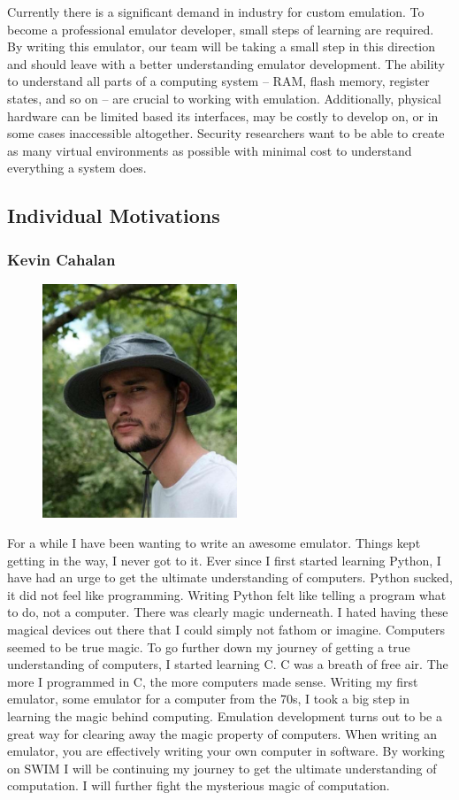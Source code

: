 \documentclass[
    paper=letter,
    parskip=half,
    fontsize=12pt,
    titlepage=firstiscover,
    toc=bibliography,
    numbers=endperiod
]{scrartcl}
\begin{document}
Currently there is a significant demand in industry for custom
emulation. To become a professional emulator developer, small steps of
learning are required. By writing this emulator, our team will be taking
a small step in this direction and should leave with a better
understanding emulator development. The ability to understand all parts
of a computing system -- RAM, flash memory, register states, and so on
-- are crucial to working with emulation. Additionally, physical
hardware can be limited based its interfaces, may be costly to develop
on, or in some cases inaccessible altogether. Security researchers want
to be able to create as many virtual environments as possible with
minimal cost to understand everything a system does.

\subsection{Individual Motivations}
\subsubsection{Kevin Cahalan}
\begin{figure}[H]
    \includegraphics[height=7cm]{profile-kevin}
\end{figure}

For a while I have been wanting to write an awesome emulator. Things
kept getting in the way, I never got to it. Ever since I first started
learning Python, I have had an urge to get the ultimate understanding of
computers. Python sucked, it did not feel like programming. Writing
Python felt like telling a program what to do, not a computer. There was
clearly magic underneath. I hated having these magical devices out there
that I could simply not fathom or imagine. Computers seemed to be true
magic. To go further down my journey of getting a true understanding of
computers, I started learning C. C was a breath of free air. The more I
programmed in C, the more computers made sense. Writing my first
emulator, some emulator for a computer from the 70s, I took a big step
in learning the magic behind computing. Emulation development turns out
to be a great way for clearing away the magic property of computers.
When writing an emulator, you are effectively writing your own computer
in software. By working on SWIM I will be continuing my journey to get
the ultimate understanding of computation. I will further fight the
mysterious magic of computation.
\end{document}
